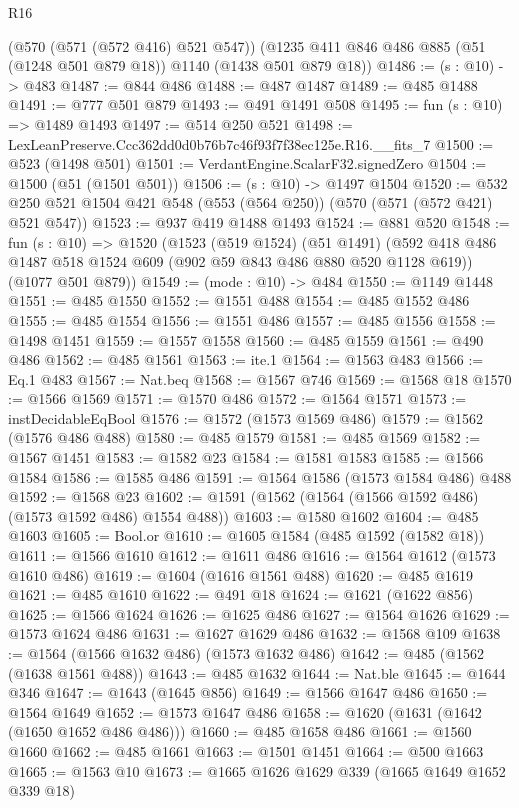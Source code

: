 \begin{lexlean}{R16}
\begin{coremodule}
    (@570 (@571 (@572 @416) @521 @547))
    (@1235 @411 @846 @486 @885 (@51 (@1248 @501 @879 @18)) @1140 (@1438 @501 @879 @18))
@1486 := (s : @10) -> @483
@1487 := @844 @486
@1488 := @487 @1487
@1489 := @485 @1488
@1491 := @777 @501 @879
@1493 := @491 @1491 @508
@1495 := fun (s : @10) => @1489 @1493
@1497 := @514 @250 @521
@1498 := LexLeanPreserve.Ccc362dd0d0b76b7c46f93f7f38ec125e.R16.__fits_7
@1500 := @523 (@1498 @501)
@1501 := VerdantEngine.ScalarF32.signedZero
@1504 := @1500 (@51 (@1501 @501))
@1506 := (s : @10) -> @1497 @1504
@1520 := @532 @250 @521 @1504 @421 @548 (@553 (@564 @250)) (@570 (@571 (@572 @421) @521 @547))
@1523 := @937 @419 @1488 @1493
@1524 := @881 @520
@1548 := fun (s : @10) =>
  @1520
    (@1523
      (@519 @1524)
      (@51 @1491)
      (@592 @418 @486 @1487 @518 @1524 @609 (@902 @59 @843 @486 @880 @520 @1128 @619))
      (@1077 @501 @879))
@1549 := (mode : @10) -> @484
@1550 := @1149 @1448
@1551 := @485 @1550
@1552 := @1551 @488
@1554 := @485 @1552 @486
@1555 := @485 @1554
@1556 := @1551 @486
@1557 := @485 @1556
@1558 := @1498 @1451
@1559 := @1557 @1558
@1560 := @485 @1559
@1561 := @490 @486
@1562 := @485 @1561
@1563 := ite.{1}
@1564 := @1563 @483
@1566 := Eq.{1} @483
@1567 := Nat.beq
@1568 := @1567 @746
@1569 := @1568 @18
@1570 := @1566 @1569
@1571 := @1570 @486
@1572 := @1564 @1571
@1573 := instDecidableEqBool
@1576 := @1572 (@1573 @1569 @486)
@1579 := @1562 (@1576 @486 @488)
@1580 := @485 @1579
@1581 := @485 @1569
@1582 := @1567 @1451
@1583 := @1582 @23
@1584 := @1581 @1583
@1585 := @1566 @1584
@1586 := @1585 @486
@1591 := @1564 @1586 (@1573 @1584 @486) @488
@1592 := @1568 @23
@1602 := @1591 (@1562 (@1564 (@1566 @1592 @486) (@1573 @1592 @486) @1554 @488))
@1603 := @1580 @1602
@1604 := @485 @1603
@1605 := Bool.or
@1610 := @1605 @1584 (@485 @1592 (@1582 @18))
@1611 := @1566 @1610
@1612 := @1611 @486
@1616 := @1564 @1612 (@1573 @1610 @486)
@1619 := @1604 (@1616 @1561 @488)
@1620 := @485 @1619
@1621 := @485 @1610
@1622 := @491 @18
@1624 := @1621 (@1622 @856)
@1625 := @1566 @1624
@1626 := @1625 @486
@1627 := @1564 @1626
@1629 := @1573 @1624 @486
@1631 := @1627 @1629 @486
@1632 := @1568 @109
@1638 := @1564 (@1566 @1632 @486) (@1573 @1632 @486)
@1642 := @485 (@1562 (@1638 @1561 @488))
@1643 := @485 @1632
@1644 := Nat.ble
@1645 := @1644 @346
@1647 := @1643 (@1645 @856)
@1649 := @1566 @1647 @486
@1650 := @1564 @1649
@1652 := @1573 @1647 @486
@1658 := @1620 (@1631 (@1642 (@1650 @1652 @486 @486)))
@1660 := @485 @1658 @486
@1661 := @1560 @1660
@1662 := @485 @1661
@1663 := @1501 @1451
@1664 := @500 @1663
@1665 := @1563 @10
@1673 := @1665 @1626 @1629 @339 (@1665 @1649 @1652 @339 @18)

\end{coremodule}
\end{lexlean}
